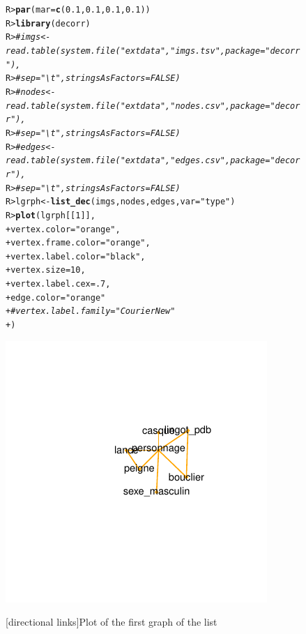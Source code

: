 \documentclass[article]{jss}\usepackage[]{graphicx}\usepackage[]{color}
\makeatletter
\def\maxwidth{ %
  \ifdim\Gin@nat@width>\linewidth
    \linewidth
  \else
    \Gin@nat@width
  \fi
}
\newcommand{\hlnum}[1]{\textcolor[rgb]{0.686,0.059,0.569}{#1}}%
\newcommand{\hlstr}[1]{\textcolor[rgb]{0.192,0.494,0.8}{#1}}%
\newcommand{\hlcom}[1]{\textcolor[rgb]{0.678,0.584,0.686}{\textit{#1}}}%
\newcommand{\hlstd}[1]{\textcolor[rgb]{0.345,0.345,0.345}{#1}}%
\newcommand{\hlkwb}[1]{\textcolor[rgb]{0.69,0.353,0.396}{#1}}%
\newcommand{\hlkwc}[1]{\textcolor[rgb]{0.333,0.667,0.333}{#1}}%
\newcommand{\hlkwd}[1]{\textcolor[rgb]{0.737,0.353,0.396}{\textbf{#1}}}%
\newenvironment{kframe}{%
 \def\at@end@of@kframe{}%
 \ifinner\ifhmode%
  \def\at@end@of@kframe{\end{minipage}}%
  \begin{minipage}{\columnwidth}%
 \fi\fi%
 \def\FrameCommand##1{\hskip\@totalleftmargin \hskip-\fboxsep
 \colorbox{shadecolor}{##1}\hskip-\fboxsep
     \hskip-\linewidth \hskip-\@totalleftmargin \hskip\columnwidth}%
 \MakeFramed {\advance\hsize-\width
   \@totalleftmargin\z@ \linewidth\hsize
   \@setminipage}}%
 {\par\unskip\endMakeFramed%
 \at@end@of@kframe}
\newenvironment{knitrout}{}{} %
\makeatother
\begin{document}
\begin{figure}[H]
\begin{knitrout}
\color{fgcolor}\begin{kframe}
\begin{alltt}
\hlstd{R> }\hlkwd{par}\hlstd{(}\hlkwc{mar}\hlstd{=}\hlkwd{c}\hlstd{(}\hlnum{0.1}\hlstd{,}\hlnum{0.1}\hlstd{,}\hlnum{0.1}\hlstd{,}\hlnum{0.1}\hlstd{) )}
\hlstd{R> }\hlkwd{library}\hlstd{(decorr)}
\hlstd{R> }\hlcom{# imgs <- read.table(system.file("extdata", "imgs.tsv", package = "decorr"),}
\hlstd{R> }\hlcom{#                       sep="\textbackslash{}t", stringsAsFactors = FALSE)}
\hlstd{R> }\hlcom{# nodes <- read.table(system.file("extdata", "nodes.csv", package = "decorr"),}
\hlstd{R> }\hlcom{#                     sep="\textbackslash{}t",stringsAsFactors = FALSE)}
\hlstd{R> }\hlcom{# edges <- read.table(system.file("extdata", "edges.csv", package = "decorr"),}
\hlstd{R> }\hlcom{#                     sep="\textbackslash{}t",stringsAsFactors = FALSE)}
\hlstd{R> }\hlstd{lgrph} \hlkwb{<-} \hlkwd{list_dec}\hlstd{(imgs,nodes,edges,}\hlkwc{var}\hlstd{=}\hlstr{"type"}\hlstd{)}
\hlstd{R> }\hlkwd{plot}\hlstd{(lgrph[[}\hlnum{1}\hlstd{]],}
\hlstd{+ }     \hlkwc{vertex.color} \hlstd{=} \hlstr{"orange"}\hlstd{,}
\hlstd{+ }     \hlkwc{vertex.frame.color}\hlstd{=}\hlstr{"orange"}\hlstd{,}
\hlstd{+ }     \hlkwc{vertex.label.color} \hlstd{=} \hlstr{"black"}\hlstd{,}
\hlstd{+ }     \hlkwc{vertex.size} \hlstd{=} \hlnum{10}\hlstd{,}
\hlstd{+ }     \hlkwc{vertex.label.cex} \hlstd{=}\hlnum{.7}\hlstd{,}
\hlstd{+ }     \hlkwc{edge.color} \hlstd{=} \hlstr{"orange"}
\hlstd{+ }     \hlcom{# vertex.label.family="Courier New"}
\hlstd{+ }     \hlstd{)}
\end{alltt}
\end{kframe}
\includegraphics[width=\maxwidth]{figure/unnamed-chunk-8-1} 

\end{knitrout}
[directional links]{Plot of the first graph of the list}
\end{figure}
\end{document}
